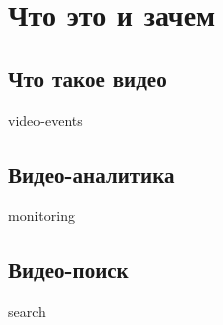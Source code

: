 \section[Зачем]{Что это и зачем}

\subsection{Что такое видео}

{video-events}

\subsection{Видео-аналитика}

{monitoring}

\subsection{Видео-поиск}

{search}


